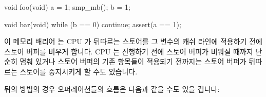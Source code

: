 \fi

\begin{VerbatimN}[fontsize=\footnotesize,samepage=true]
void foo(void)
{
	a = 1;
	smp_mb();
	b = 1;
}

void bar(void)
{
	while (b == 0) continue;
	assert(a == 1);
}
\end{VerbatimN}

이 메모리 배리어  는 CPU 가 뒤따르는 스토어를 그 변수의 캐쉬
라인에 적용하기 전에 스토어 버퍼를 비우게 합니다.
CPU 는 진행하기 전에 스토어 버퍼가 비워질 때까지 단순히 멈춰 있거나 스토어
버퍼의 기존 항목들이 적용되기 전까지는 스토어 버퍼가 뒤따르는 스토어를
중지시키게 할 수도 있습니다. 

뒤의 방법의 경우 오퍼레이션들의 흐름은 다음과 같을 수도 있을 겁니다:

\iffalse

The memory barrier \co{smp_mb()} will cause the CPU to flush its store
buffer before applying each subsequent store to its variable's cache line.
The CPU could either simply stall until the store buffer was empty
before proceeding, or it could use the store buffer to hold subsequent
stores until all of the prior entries in the store buffer had been
applied.

With this latter approach the sequence of operations might be as follows:

\fi

